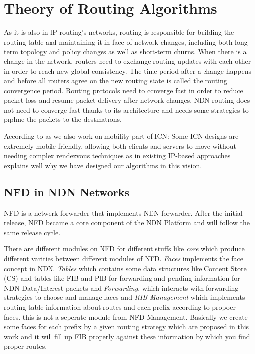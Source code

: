 

\chapter{Theory of Routing Algorithms} %
\label{dash7}


As it is also in IP routing's networks, routing is responsible for building the routing table and maintaining it in face of network changes, including both long-term topology and policy changes as well as short-term churns.  When there is a change in the network, routers need to exchange routing updates with each other in order to reach new global consistency. The time period after a change happens and before all routers agree on the new routing state is called the routing convergence period. Routing protocols need to converge fast in order to reduce packet loss and resume packet delivery after network changes. NDN routing does not need to converge fast thanks to its architecture and needs some strategies to pipline the packets to the destinations.

According to \cite{oran} as we also work on mobility part of ICN: Some ICN designs are extremely mobile friendly, allowing  both  clients  and  servers  to  move  without  needing complex rendezvous techniques as in existing   IP-based approaches explains well why we have designed our algorithms in this vision.

\section{NFD in NDN Networks}
NFD is a network forwarder that implements NDN forwarder. After the initial release, NFD became a core component of the NDN Platform and will follow the same release cycle. 

There are different modules on NFD for different stuffs like \textit{core} which produce different varities between different modules of NFD. \textit{Faces} implements the face concept in NDN. \textit{Tables} which contains some data structures like Content Store (CS) and tables like FIB and PIB for forwarding and pending information for NDN Data/Interest packets and \textit{Forwarding}, which interacts with forwarding strategies to choose and manage faces and \textit{RIB Management} which implements routing table information about routes and each prefix according to propoer faces. this is not a seperate module from NFD Management. Basically we create some faces for each prefix by a given routing strategy which are proposed in this work and it will fill up FIB properly against these information by which you find proper routes.

